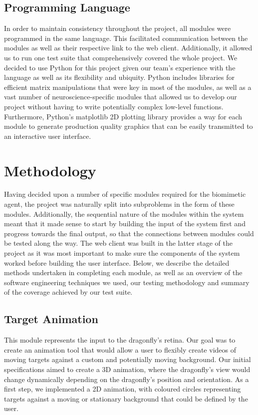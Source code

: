 \documentclass[a4paper,11pt]{article}
\begin{document}
\subsection{Programming Language}
In order to maintain consistency throughout the project, all modules were programmed in the same language. This facilitated communication between the modules as well as their respective link to the web client. Additionally, it allowed us to run one test suite that comprehensively covered the whole project. We decided to use Python \cite{python} for this project given our team's experience with the language as well as its flexibility and ubiquity. Python includes libraries for efficient matrix manipulations that were key in most of the modules, as well as a vast number of neuroscience-specific modules that allowed us to develop our project without having to write potentially complex low-level functions. Furthermore, Python's matplotlib 2D plotting library provides a way for each module to generate production quality graphics that can be easily transmitted to an interactive user interface.


\clearpage
\section{Methodology}
Having decided upon a number of specific modules required for the biomimetic agent, the project was naturally split into subproblems in the form of these modules. Additionally, the sequential nature of the modules within the system meant that it made sense to start by building the input of the system first and progress towards the final output, so that the connections between modules could be tested along the way. The web client was built in the latter stage of the project as it was most important to make sure the components of the system worked before building the user interface. Below, we describe the detailed methods undertaken in completing each module, as well as an overview of the software engineering techniques we used, our testing methodology and summary of the coverage achieved by our test suite.

\subsection{Target Animation}
This module represents the input to the dragonfly's retina. Our goal was to create an animation tool that would allow a user to flexibly create videos of moving targets against a custom and potentially moving background. Our initial specifications aimed to create a 3D animation, where the dragonfly's view would change dynamically depending on the dragonfly's position and orientation. As a first step, we implemented a 2D animation, with coloured circles representing targets against a moving or stationary background that could be defined by the user.
\end{document}
